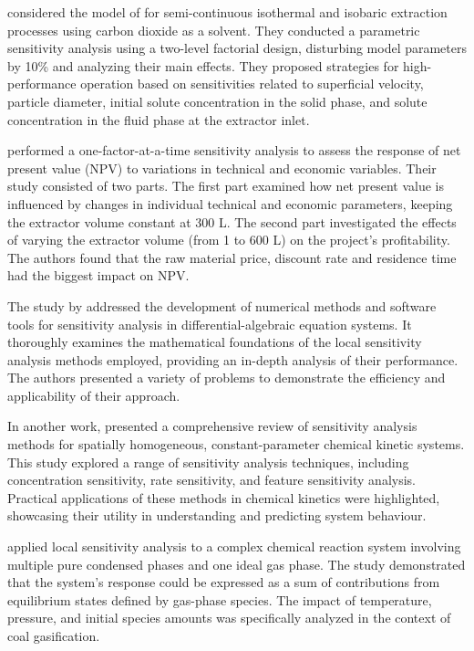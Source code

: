 \documentclass[a4paper,fleqn]{cas-dc}
\begin{document}
	\citet{Santos2000} considered the model of \citet{Sovova1994} for semi-continuous isothermal and isobaric extraction processes using carbon dioxide as a solvent. They conducted a parametric sensitivity analysis using a two-level factorial design, disturbing model parameters by 10\% and analyzing their main effects. They proposed strategies for high-performance operation based on sensitivities related to superficial velocity, particle diameter, initial solute concentration in the solid phase, and solute concentration in the fluid phase at the extractor inlet.
	
	\citet{Hatami2024} performed a one-factor-at-a-time sensitivity analysis to assess the response of net present value (NPV) to variations in technical and economic variables. Their study consisted of two parts. The first part examined how net present value is influenced by changes in individual technical and economic parameters, keeping the extractor volume constant at 300 L. The second part investigated the effects of varying the extractor volume (from 1 to 600 L) on the project's profitability. The authors found that the raw material price, discount rate and residence time had the biggest impact on NPV.
	
	The study by \citet{Maly1996} addressed the development of numerical methods and software tools for sensitivity analysis in differential-algebraic equation systems. It thoroughly examines the mathematical foundations of the local sensitivity analysis methods employed, providing an in-depth analysis of their performance. The authors presented a variety of problems to demonstrate the efficiency and applicability of their approach.
		
	In another work, \citet{Turanyi1990} presented a comprehensive review of sensitivity analysis methods for spatially homogeneous, constant-parameter chemical kinetic systems. This study explored a range of sensitivity analysis techniques, including concentration sensitivity, rate sensitivity, and feature sensitivity analysis. Practical applications of these methods in chemical kinetics were highlighted, showcasing their utility in understanding and predicting system behaviour.
		
	\citet{Fishtik1997} applied local sensitivity analysis to a complex chemical reaction system involving multiple pure condensed phases and one ideal gas phase. The study demonstrated that the system's response could be expressed as a sum of contributions from equilibrium states defined by gas-phase species. The impact of temperature, pressure, and initial species amounts was specifically analyzed in the context of coal gasification.
		
\end{document}
